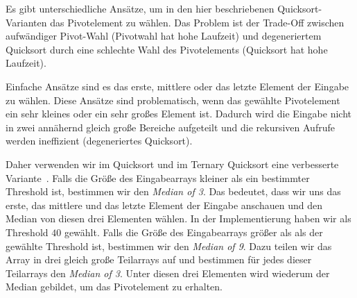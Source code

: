 Es gibt unterschiedliche Ansätze, um in den hier beschriebenen Quicksort- Varianten das Pivotelement zu wählen.
Das Problem ist der Trade-Off zwischen aufwändiger Pivot-Wahl (Pivotwahl hat hohe Laufzeit) und
degeneriertem Quicksort durch eine schlechte Wahl des Pivotelements (Quicksort hat hohe Laufzeit).

Einfache Ansätze sind es das erste, mittlere oder das letzte Element der Eingabe zu wählen.
Diese Ansätze sind problematisch, wenn das gewählte Pivotelement ein sehr kleines oder ein sehr großes Element ist.
Dadurch wird die Eingabe nicht in zwei annähernd gleich große Bereiche aufgeteilt und
die rekursiven Aufrufe werden ineffizient (degeneriertes Quicksort).

Daher verwenden wir im Quicksort und im Ternary Quicksort eine verbesserte Variante~\cite{ternary_quicksort}.
Falls die Größe des Eingabearrays kleiner als ein bestimmter Threshold ist,
bestimmen wir den \emph{Median of 3}. Das bedeutet, dass wir uns das erste,
das mittlere und das letzte Element der Eingabe anschauen und den Median von diesen drei Elementen wählen.
In der Implementierung haben wir als Threshold $40$ gewählt.
Falls die Größe des Eingabearrays größer als als der gewählte Threshold ist,
bestimmen wir den \emph{Median of 9}. Dazu teilen wir das Array in drei gleich große Teilarrays auf
und bestimmen für jedes dieser Teilarrays den \emph{Median of 3}.
Unter diesen drei Elementen wird wiederum der Median gebildet, um das Pivotelement zu erhalten.
